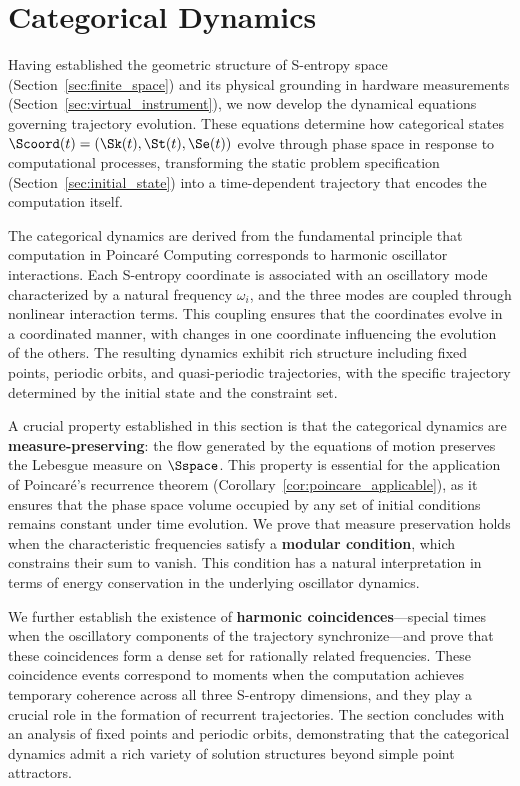 \section{Categorical Dynamics}
\label{sec:categorical_dynamics}

Having established the geometric structure of S-entropy space (Section~\ref{sec:finite_space}) and its physical grounding in hardware measurements (Section~\ref{sec:virtual_instrument}), we now develop the dynamical equations governing trajectory evolution. These equations determine how categorical states $\Scoord(t) = (\Sk(t), \St(t), \Se(t))$ evolve through phase space in response to computational processes, transforming the static problem specification (Section~\ref{sec:initial_state}) into a time-dependent trajectory that encodes the computation itself.

The categorical dynamics are derived from the fundamental principle that computation in Poincaré Computing corresponds to harmonic oscillator interactions. Each S-entropy coordinate is associated with an oscillatory mode characterized by a natural frequency $\omega_i$, and the three modes are coupled through nonlinear interaction terms. This coupling ensures that the coordinates evolve in a coordinated manner, with changes in one coordinate influencing the evolution of the others. The resulting dynamics exhibit rich structure including fixed points, periodic orbits, and quasi-periodic trajectories, with the specific trajectory determined by the initial state and the constraint set.

A crucial property established in this section is that the categorical dynamics are \textbf{measure-preserving}: the flow generated by the equations of motion preserves the Lebesgue measure on $\Sspace$. This property is essential for the application of Poincaré's recurrence theorem (Corollary~\ref{cor:poincare_applicable}), as it ensures that the phase space volume occupied by any set of initial conditions remains constant under time evolution. We prove that measure preservation holds when the characteristic frequencies satisfy a \textbf{modular condition}, which constrains their sum to vanish. This condition has a natural interpretation in terms of energy conservation in the underlying oscillator dynamics.

We further establish the existence of \textbf{harmonic coincidences}---special times when the oscillatory components of the trajectory synchronize---and prove that these coincidences form a dense set for rationally related frequencies. These coincidence events correspond to moments when the computation achieves temporary coherence across all three S-entropy dimensions, and they play a crucial role in the formation of recurrent trajectories. The section concludes with an analysis of fixed points and periodic orbits, demonstrating that the categorical dynamics admit a rich variety of solution structures beyond simple point attractors.

